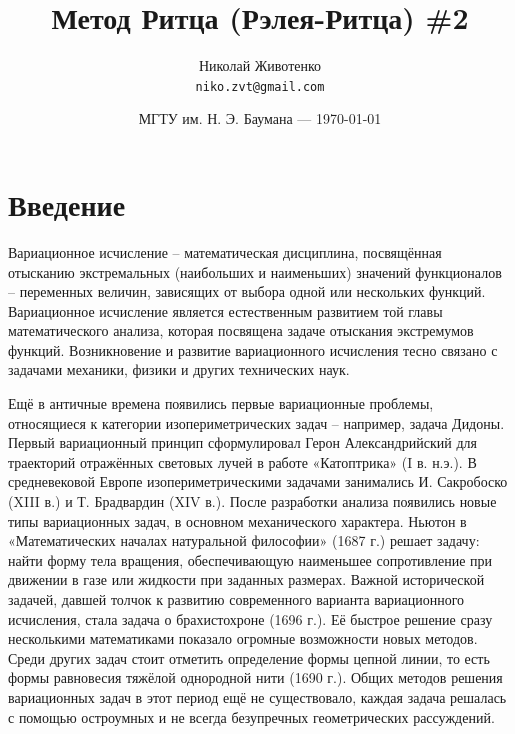 \documentclass{article}
\title{Метод Ритца (Рэлея-Ритца) \#2} %
\author{Николай Животенко\\ \texttt{niko.zvt@gmail.com}} %
\date{МГТУ им. Н. Э. Баумана --- \today} %
\begin{document}
\maketitle %


\section*{Введение} %

\begin{info} %
	Вариационное исчисление – математическая дисциплина, посвящённая отысканию экстремальных (наибольших и наименьших) значений функционалов – переменных величин, зависящих от выбора одной или нескольких функций. Вариационное исчисление является естественным развитием той главы математического анализа, которая посвящена задаче отыскания экстремумов функций. Возникновение и развитие вариационного исчисления тесно связано с задачами механики, физики и других технических наук.
\end{info}

Ещё в античные времена появились первые вариационные проблемы, относящиеся к категории изопериметрических задач – например, задача Дидоны. Первый вариационный принцип сформулировал Герон Александрийский для траекторий отражённых световых лучей в работе «Катоптрика» (I в. н.э.). В средневековой Европе изопериметрическими задачами занимались И. Сакробоско (XIII в.) и Т. Брадвардин (XIV в.). После разработки анализа появились новые типы вариационных задач, в основном механического характера. Ньютон в «Математических началах натуральной философии» (1687 г.) решает задачу: найти форму тела вращения, обеспечивающую наименьшее сопротивление при движении в газе или жидкости при заданных размерах. Важной исторической задачей, давшей толчок к развитию современного варианта вариационного исчисления, стала задача о брахистохроне (1696 г.). Её быстрое решение сразу несколькими математиками показало огромные возможности новых методов. Среди других задач стоит отметить определение формы цепной линии, то есть формы равновесия тяжёлой однородной нити (1690 г.). Общих методов решения вариационных задач в этот период ещё не существовало, каждая задача решалась с помощью остроумных и не всегда безупречных геометрических рассуждений.
\end{document}
